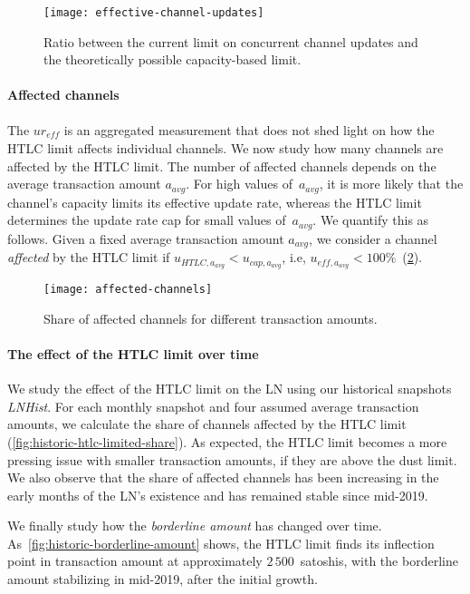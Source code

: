 \begin{figure}[tb]
	\centering
	\texttt{[image: effective-channel-updates]}
	\caption{Ratio between the current limit on concurrent channel updates and the theoretically possible capacity-based limit.}
	\label{fig:effective-channel-updates}
\end{figure}

\paragraph{Affected channels}
The $ur_\textit{eff}$ is an aggregated measurement that does not shed light on how the HTLC limit affects individual channels. 
We now study how many channels are affected by the HTLC limit.
The number of affected channels depends on the average transaction amount $a_\textit{avg}$.
For high values of~$a_\textit{avg}$, it is more likely that the channel's capacity limits its effective update rate, whereas the HTLC limit determines the update rate cap for small values of~$a_\textit{avg}$.
We quantify this as follows.
Given a fixed average transaction amount $a_\textit{avg}$, we consider a channel \textit{affected} by the HTLC limit if $u_{\textit{HTLC},a_\textit{avg}} < u_{\textit{cap},a_\textit{avg}}$, i.e, $u_{\textit{eff},a_\textit{avg}} < 100\%$~(\cref{fig:affected-channels}).

\begin{figure}[tb]
	\centering
	\texttt{[image: affected-channels]}
	\caption{Share of affected channels for different transaction amounts.}
	\label{fig:affected-channels}
\end{figure}


\paragraph{The effect of the HTLC limit over time}

We study the effect of the HTLC limit on the LN using our historical snapshots \emph{LNHist}.
For each monthly snapshot and four assumed average transaction amounts, we calculate the share of channels affected by the HTLC limit (\cref{fig:historic-htlc-limited-share}).
As expected, the HTLC limit becomes a more pressing issue with smaller transaction amounts, if they are above the dust limit.
We also observe that the share of affected channels has been increasing in the early months of the LN's existence and has remained stable since mid-2019.

We finally study how the \textit{borderline amount} has changed over time.
As~\cref{fig:historic-borderline-amount} shows, the HTLC limit finds its inflection point in transaction amount at approximately $2\,500$~satoshis, with the borderline amount stabilizing in mid-2019, after the initial growth.

